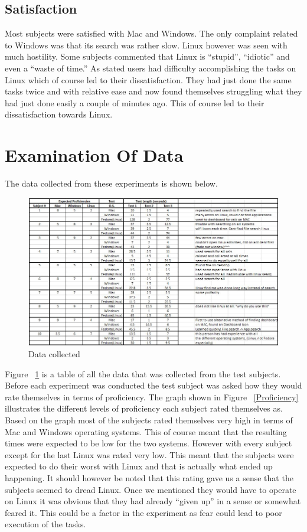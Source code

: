 \documentclass[11pt]{article}
\begin{document}
\subsection{Satisfaction}
Most subjects were satisfied with Mac and Windows. The only complaint related to Windows was that its search was rather slow. Linux however was seen with much hostility. Some subjects commented that Linux is “stupid”, “idiotic” and even a “waste of time.” As stated users had difficulty accomplishing the tasks on Linux which of course led to their dissatisfaction. They had just done the same tasks twice and with relative ease and now found themselves struggling what they had just done easily a couple of minutes ago. This of course led to their dissatisfaction towards Linux.

\section{Examination Of Data}
The data collected from these experiments is shown below.

\begin{figure}[h!]
  \centering
    \includegraphics[width= 1\textwidth]{./Images/Data_table}
  \caption{Data collected}
 \label{Collect}
\end{figure}



Figure ~\ref{Collect} is a table of all the data that was collected from the test subjects. Before each experiment was conducted the test subject was asked how they would rate themselves in terms of proficiency. The graph shown in Figure ~\ref{Proficiency} illustrates the different levels of proficiency each subject rated themselves as. Based on the graph most of the subjects rated themselves very high in terms of Mac and Windows operating systems. This of course meant that the resulting times were expected to be low for the two systems. However with every subject except for the last Linux was rated very low. This meant that the subjects were expected to do their worst with Linux and that is actually what ended up happening. It should however be noted that this rating gave us a sense that the subjects seemed to dread Linux. Once we mentioned they would have to operate on Linux it was obvious that they had already “given up” in a sense or somewhat feared it. This could be a factor in the experiment as fear could lead to poor execution of the tasks. 
\end{document}
